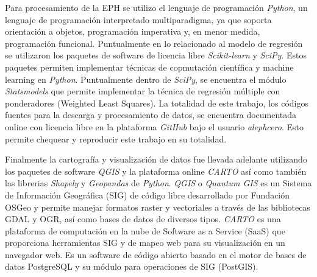 Para procesamiento de la EPH se utilizo el lenguaje de programación \textit{Python}, un lenguaje de programación interpretado multiparadigma, ya que soporta orientación a objetos, programación imperativa y, en menor medida, programación funcional. Puntualmente en lo relacionado al modelo de regresión se utilizaron los paquetes de software de licencia libre \textit{Scikit-learn} y \textit{SciPy}. Estos paquetes permiten implementar técnicas de copmutación científica y machine learning en \textit{Python}. Puntualmente dentro de \textit{SciPy}, se encuentra el módulo \textit{Statsmodels} que permite implementar la técnica de regresión múltiple con ponderadores (Weighted Least Squares). La totalidad de este trabajo, los códigos fuentes para la descarga y procesamiento de datos, se encuentra documentada online con licencia libre en la plataforma \textit{GitHub} bajo el usuario \textit{alephcero}. Esto permite chequear y reproducir este trabajo en su totalidad.


Finalmente la cartografía y visualización de datos fue llevada adelante utilizando los paquetes de software \textit{QGIS} y la plataforma online \textit{CARTO} así como también las librerias \textit{Shapely} y \textit{Geopandas} de \textit{Python}. \textit{QGIS} o \textit{Quantum GIS} es un Sistema de Información Geográfica (SIG) de código libre desarrollado por Fundación OSGeo y permite manejar formatos raster y vectoriales a través de las bibliotecas GDAL y OGR, así como bases de datos de diversos tipos. \textit{CARTO}  es una plataforma de computación en la nube de Software as a Service (SaaS) que proporciona herramientas SIG y de mapeo web para su visualización en un navegador web. Es un software de código abierto basado en el motor de bases de datos PostgreSQL  y su módulo para operaciones de SIG (PostGIS). 

